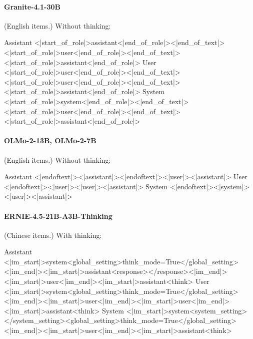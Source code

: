 \paragraph{Granite-4.1-30B} (English items.)
\noindent Without thinking:
\begin{Rendering}
Assistant  <|start_of_role|>assistant<|end_of_role|><|end_of_text|>\NL{}<|start_of_role|>user<|end_of_role|><|end_of_text|>\NL{}<|start_of_role|>assistant<|end_of_role|>
User       <|start_of_role|>user<|end_of_role|><|end_of_text|>\NL{}<|start_of_role|>user<|end_of_role|><|end_of_text|>\NL{}<|start_of_role|>assistant<|end_of_role|>
System     <|start_of_role|>system<|end_of_role|><|end_of_text|>\NL{}<|start_of_role|>user<|end_of_role|><|end_of_text|>\NL{}<|start_of_role|>assistant<|end_of_role|>
\end{Rendering}
\paragraph{OLMo-2-13B, OLMo-2-7B} (English items.)
\noindent Without thinking:
\begin{Rendering}
Assistant  <|endoftext|><|assistant|>\NL{}<|endoftext|>\NL{}<|user|>\NL{}\NL{}<|assistant|>\NL{}
User       <|endoftext|><|user|>\NL{}\NL{}<|user|>\NL{}\NL{}<|assistant|>\NL{}
System     <|endoftext|><|system|>\NL{}\NL{}<|user|>\NL{}\NL{}<|assistant|>\NL{}
\end{Rendering}
\paragraph{ERNIE-4.5-21B-A3B-Thinking} (Chinese items.)
\noindent With thinking:
\begin{Rendering}
Assistant  <|im_start|>system\NL{}<global_setting>\NL{}think_mode=True\NL{}</global_setting><|im_end|>\NL{}\NL{}<|im_start|>assistant\NL{}<response>\NL{}\NL{}</response>\NL{}<|im_end|>\NL{}\NL{}<|im_start|>user\NL{}<|im_end|>\NL{}\NL{}<|im_start|>assistant\NL{}<think>\NL{}
User       <|im_start|>system\NL{}<global_setting>\NL{}think_mode=True\NL{}</global_setting><|im_end|>\NL{}\NL{}<|im_start|>user\NL{}<|im_end|>\NL{}\NL{}<|im_start|>user\NL{}<|im_end|>\NL{}\NL{}<|im_start|>assistant\NL{}<think>\NL{}
System     <|im_start|>system\NL{}<system_setting>\NL{}\NL{}</system_setting>\NL{}\NL{}<global_setting>\NL{}think_mode=True\NL{}</global_setting><|im_end|>\NL{}\NL{}<|im_start|>user\NL{}<|im_end|>\NL{}\NL{}<|im_start|>assistant\NL{}<think>\NL{}
\end{Rendering}
